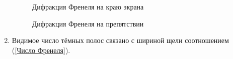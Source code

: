 \documentclass[a4paper, 12pt]{article}
\begin{document}
\begin{enumerate}
	 \begin{figure}[h!]
		 \begin{minipage}{0.5\textwidth}
			 \caption{Дифракция Френеля на краю экрана}
		 \end{minipage}
		 \begin{minipage}{0.5\textwidth}
	 	\caption{Дифракция Френеля на препятствии}
		\end{minipage}
	\end{figure}

	 \item Видимое число тёмных полос связано с шириной щели соотношением (\ref{Число Френеля}).

\end{enumerate}
\end{document}

